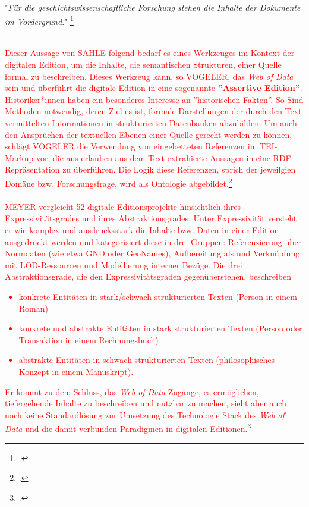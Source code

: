 \documentclass[12pt,a4paper]{article}
\begin{document}
"\textit{Für die geschichtswissenschaftliche Forschung stehen die Inhalte der Dokumente im Vordergrund}."
\footcite[][S.236]{sahle2017dhedition}
\\
\\
\textcolor{red}{
Dieser Aussage von SAHLE folgend bedarf es eines Werkzeuges im Kontext der digitalen Edition, um die Inhalte, die semantischen Strukturen, einer Quelle formal zu beschreiben. Dieses Werkzeug kann, so VOGELER, das \textit{Web of Data} sein und überführt die digitale Edition in eine sogenannte \textbf{''Assertive Edition''}.
\\  
Historiker*innen haben ein besonderes Interesse an ''historischen Fakten''. So Sind Methoden notwendig, deren Ziel es ist, formale Darstellungen der durch den Text vermittelten Informationen in strukturierten Datenbanken abzubilden. Um auch den Ansprüchen der textuellen Ebenen einer Quelle gerecht werden zu können, schlägt VOGELER die Verwendung von eingebetteten Referenzen im TEI-Markup vor, die aus erlauben aus dem Text extrahierte Aussagen in eine RDF-Repräsentation zu überführen. Die Logik diese Referenzen, sprich der jeweilgien Domäne bzw. Forschungsfrage, wird als Ontologie abgebildet.\footcite[][]{vogeler2019assertive}
\\
\\
MEYER vergleicht 52 digitale Editionsprojekte hinsichtlich ihres Expressivitätsgrades und ihres Abstraktionsgrades. Unter Expressivität versteht er wie komplex und ausdrucksstark die Inhalte bzw. Daten in einer Edition ausgedrückt werden und kategorisiert diese in drei Gruppen:  Referenzierung über Normdaten (wie etwa GND oder GeoNames), Aufbereitung als und Verknüpfung mit LOD-Ressourcen und Modellierung interner Bezüge. Die drei Abstraktionsgrade, die den Expressivitätsgraden gegenüberstehen, beschreiben 
\begin{itemize}
\item konkrete Entitäten in stark/schwach strukturierten Texten (Person in einem Roman)
\item konkrete und abstrakte Entitäten in stark strukturierten Texten (Person oder Transaktion in einem Rechnungsbuch) 
\item 
abstrakte Entitäten in schwach strukturierten Texten (philosophisches Konzept in einem Manuskript).
\end{itemize}
Er kommt zu dem Schluss, das \textit{Web of Data} Zugänge, es ermöglichen, tiefergehende Inhalte zu beschreiben und nutzbar zu machen, sieht aber auch noch keine Standardlösung zur Umsetzung des Technologie Stack des \textit{Web of Data} und die damit verbunden Paradigmen in digitalen Editionen.\footcite[][]{meyer2019datenmodellierung}  
}
\end{document}
